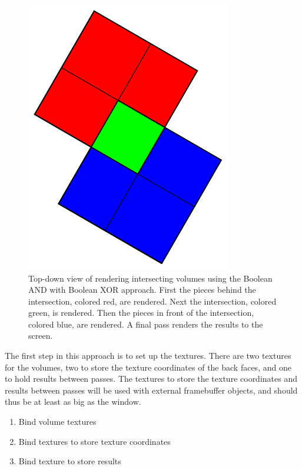 \documentclass{report}
\begin{document}
\begin{figure}
\centering
\includegraphics[width=0.8\textwidth]{boolean-xor.pdf}
\caption{
Top-down view of rendering intersecting volumes using the Boolean AND with
Boolean XOR approach.  First the pieces behind the intersection, colored red,
are rendered.  Next the intersection, colored green, is rendered.  Then the
pieces in front of the intersection, colored blue, are rendered.  A final pass
renders the results to the screen.
}
\label{boolean-xor}
\end{figure}

The first step in this approach is to set up the textures.  There are two
textures for the volumes, two to store the texture coordinates of the back
faces, and one to hold results between passes.  The textures to store the
texture coordinates and results between passes will be used with external
framebuffer objects, and should thus be at least as big as the window.

\begin{enumerate}
  \item Bind volume textures
  \item Bind textures to store texture coordinates
  \item Bind texture to store results
\end{enumerate}
\end{document}
